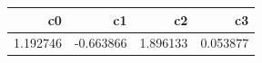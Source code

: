 \begin{tabular}{rrrr}
\toprule
c0 & c1 & c2 & c3 \\
\midrule
1.192746 & -0.663866 & 1.896133 & 0.053877 \\
\bottomrule
\end{tabular}
